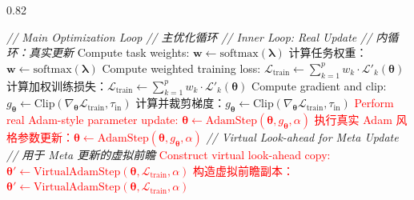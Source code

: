 \documentclass[11pt]{article}
\begin{document}
\begin{algorithm}[!htbp]
\begin{spacing}{0.82}
\begin{algorithmic}[1]
		\State \textit{// Main Optimization Loop}
		\State \textit{// 主优化循环}
		\State \textit{// Inner Loop: Real Update}
		\State \textit{// 内循环：真实更新}
		\State Compute task weights: $\mathbf{w} \gets \text{softmax}(\boldsymbol{\lambda})$
		\State 计算任务权重：$\mathbf{w} \gets \text{softmax}(\boldsymbol{\lambda})$
		\State Compute weighted training loss: $\mathcal{L}_{\text{train}} \gets \sum_{k=1}^{p} w_{k} \cdot \mathcal{L}'_{k}(\boldsymbol{\theta})$ 
		\State 计算加权训练损失：$\mathcal{L}_{\text{train}} \gets \sum_{k=1}^{p} w_{k} \cdot \mathcal{L}'_{k}(\boldsymbol{\theta})$ 
		\State Compute gradient and clip: $g_{\boldsymbol{\theta}} \gets \text{Clip}(\nabla_{\boldsymbol{\theta}} \mathcal{L}_{\text{train}}, \tau_{\text{in}})$
		\State 计算并裁剪梯度：$g_{\boldsymbol{\theta}} \gets \text{Clip}(\nabla_{\boldsymbol{\theta}} \mathcal{L}_{\text{train}}, \tau_{\text{in}})$
		\State \textcolor{red}{Perform real Adam-style parameter update: $\boldsymbol{\theta} \gets \text{AdamStep}(\boldsymbol{\theta}, g_{\boldsymbol{\theta}}, \alpha)$}
		\State \textcolor{red}{执行真实 Adam 风格参数更新：$\boldsymbol{\theta} \gets \text{AdamStep}(\boldsymbol{\theta}, g_{\boldsymbol{\theta}}, \alpha)$}
		\State \textit{// Virtual Look-ahead for Meta Update}
		\State \textit{// 用于 Meta 更新的虚拟前瞻}
		\State \textcolor{red}{Construct virtual look-ahead copy: $\boldsymbol{\theta}' \gets \text{VirtualAdamStep}(\boldsymbol{\theta}, \mathcal{L}_{\text{train}}, \alpha)$}
		\State \textcolor{red}{构造虚拟前瞻副本：$\boldsymbol{\theta}' \gets \text{VirtualAdamStep}(\boldsymbol{\theta}, \mathcal{L}_{\text{train}}, \alpha)$}
		

\end{algorithmic}
\end{spacing}
\end{algorithm}
\end{document}
